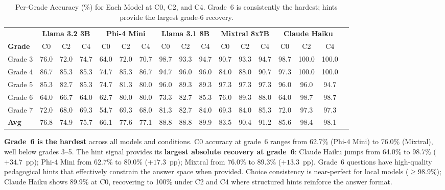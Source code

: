 \documentclass[journal]{IEEEtran}
\begin{document}
\begin{table}[t]
\centering
\caption{Per-Grade Accuracy (\%) for Each Model at C0, C2, and C4.
         Grade~6 is consistently the hardest; hints provide the largest grade-6 recovery.}
\label{tab:pergrade}
\renewcommand{\arraystretch}{1.3}
\begin{tabular}{lcccccccccccccccc}
\toprule
& \multicolumn{3}{c}{\textbf{Llama 3.2 3B}}
& \multicolumn{3}{c}{\textbf{Phi-4 Mini}}
& \multicolumn{3}{c}{\textbf{Llama 3.1 8B}}
& \multicolumn{3}{c}{\textbf{Mixtral 8x7B}}
& \multicolumn{3}{c}{\textbf{Claude Haiku}} \\
\cmidrule(lr){2-4}\cmidrule(lr){5-7}\cmidrule(lr){8-10}\cmidrule(lr){11-13}\cmidrule(lr){14-16}
\textbf{Grade} & C0 & C2 & C4 & C0 & C2 & C4 & C0 & C2 & C4 & C0 & C2 & C4 & C0 & C2 & C4 \\
\midrule
\rowcolor{lightpurple}
Grade 3 & 76.0 & 72.0 & 74.7 & 64.0 & 72.0 & 70.7 & 98.7 & 93.3 & 94.7 & 90.7 & 93.3 & 94.7 & 98.7 & 100.0 & 100.0 \\
Grade 4 & 86.7 & 85.3 & 85.3 & 74.7 & 85.3 & 86.7 & 94.7 & 96.0 & 96.0 & 84.0 & 88.0 & 90.7 & 97.3 & 100.0 & 100.0 \\
\rowcolor{lightpurple}
Grade 5 & 85.3 & 82.7 & 85.3 & 74.7 & 81.3 & 80.0 & 96.0 & 89.3 & 89.3 & 97.3 & 97.3 & 97.3 & 96.0 &  96.0 &  94.7 \\
Grade 6 & 64.0 & 66.7 & 64.0 & 62.7 & 80.0 & 80.0 & 73.3 & 82.7 & 85.3 & 76.0 & 89.3 & 88.0 & 64.0 &  98.7 &  98.7 \\
\rowcolor{lightpurple}
Grade 7 & 72.0 & 68.0 & 69.3 & 54.7 & 69.3 & 68.0 & 81.3 & 82.7 & 84.0 & 69.3 & 84.0 & 85.3 & 72.0 &  97.3 &  97.3 \\
\midrule
\textbf{Avg}  & 76.8 & 74.9 & 75.7 & 66.1 & 77.6 & 77.1 & 88.8 & 88.8 & 89.9 & 83.5 & 90.4 & 91.2 & 85.6 & 98.4 & 98.1 \\
\bottomrule
\end{tabular}
\end{table}

\textbf{Grade~6 is the hardest} across all models and conditions. C0 accuracy
at grade~6 ranges from 62.7\% (Phi-4 Mini) to 76.0\% (Mixtral), well below
grades 3--5. The hint signal provides its \textbf{largest absolute recovery at
grade~6}: Claude Haiku jumps from 64.0\% to 98.7\% ($+34.7$~pp); Phi-4 Mini
from 62.7\% to 80.0\% ($+17.3$~pp); Mixtral from 76.0\% to 89.3\% ($+13.3$~pp).
Grade~6 questions have high-quality pedagogical hints that effectively constrain
the answer space when provided. Choice consistency is near-perfect for local
models ($\geq$98.9\%); Claude Haiku shows 89.9\% at C0, recovering to 100\%
under C2 and C4 where structured hints reinforce the answer format.
\end{document}
